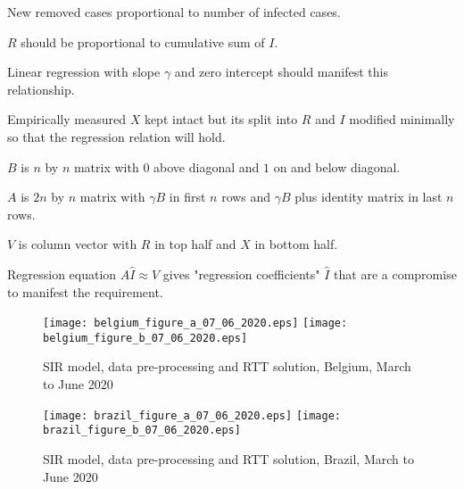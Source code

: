\documentclass{article}
\begin{document}
\newpage
	

\bigskip

\noindent New removed cases proportional to number of infected cases.

\bigskip

\noindent $R$ should be proportional to cumulative sum of $I$.

\bigskip

\noindent Linear regression with slope $\gamma$ and zero intercept should manifest this relationship.

\bigskip

\noindent Empirically measured $X$ kept intact but its split into $R$ and $I$ modified minimally so that the regression relation will hold.

\bigskip

\noindent $B$ is $n$ by $n$ matrix with $0$ above diagonal and $1$ on and below diagonal.

\noindent $A$ is $2 n$ by $n$ matrix with $\gamma B$ in first $n$ rows and $\gamma B$ plus identity matrix in last $n$ rows.

\noindent $V$ is column vector with $R$ in top half and $X$ in bottom half.

\bigskip

\noindent Regression equation $A \hat{I} \approx V$ gives "regression coefficients" $\hat{I}$ that are a compromise to manifest the requirement.

\newpage

\begin{figure}
\begin{center}
{\texttt{[image: belgium\_figure\_a\_07\_06\_2020.eps]}}
\qquad
{\texttt{[image: belgium\_figure\_b\_07\_06\_2020.eps]}}
\end{center}
\begin{center}
\caption{SIR model, data pre-processing and RTT solution, Belgium, March to June 2020
}
\label{fig:belgium_sir_model_07_06_2020}
\end{center}
\end{figure}


\begin{figure}
\begin{center}
{\texttt{[image: brazil\_figure\_a\_07\_06\_2020.eps]}}
\qquad
{\texttt{[image: brazil\_figure\_b\_07\_06\_2020.eps]}}
\end{center}
\begin{center}
\caption{SIR model, data pre-processing and RTT solution, Brazil, March to June 2020
}
\label{fig:brazil_sir_model_07_06_2020}
\end{center}
\end{figure}
\end{document}
